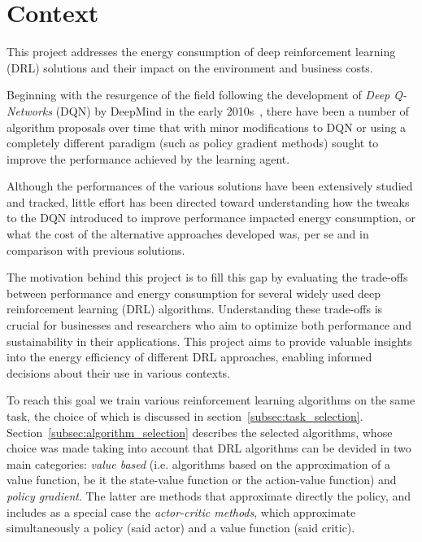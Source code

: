 \section{Context}
\label{sec:context}
This project addresses the energy consumption of deep reinforcement learning (DRL) solutions and their impact on the environment and business costs.

Beginning with the resurgence of the field following the development of \textit{Deep Q-Networks} (DQN) by DeepMind in the early 2010s~\cite{mnih:atari}, there have been a number of algorithm proposals over time that with minor modifications to DQN or using a completely different paradigm (such as policy gradient methods) sought to improve the performance achieved by the learning agent.

Although the performances of the various solutions have been extensively studied and tracked, little effort has been directed toward understanding how the tweaks to the DQN introduced to improve performance impacted energy consumption, or what the cost of the alternative approaches developed was, per se and in comparison with previous solutions.

The motivation behind this project is to fill this gap by evaluating the trade-offs between performance and energy consumption for several widely used deep reinforcement learning (DRL) algorithms. Understanding these trade-offs is crucial for businesses and researchers who aim to optimize both performance and sustainability in their applications. This project aims to provide valuable insights into the energy efficiency of different DRL approaches, enabling informed decisions about their use in various contexts.

To reach this goal we train various reinforcement learning algorithms on the same task, the choice of which is discussed in section~\vref{subsec:task_selection}. Section~\vref{subsec:algorithm_selection} describes the selected algorithms, whose choice was made taking into account that DRL algorithms can be devided in two main categories: \textit{value based} (i.e. algorithms based on the approximation of a value function, be it the state-value function or the action-value function) and \textit{policy gradient}. The latter are methods that approximate directly the policy, and includes as a special case the \textit{actor-critic methods}, which approximate simultaneously a policy (said actor) and a value function (said critic). 

